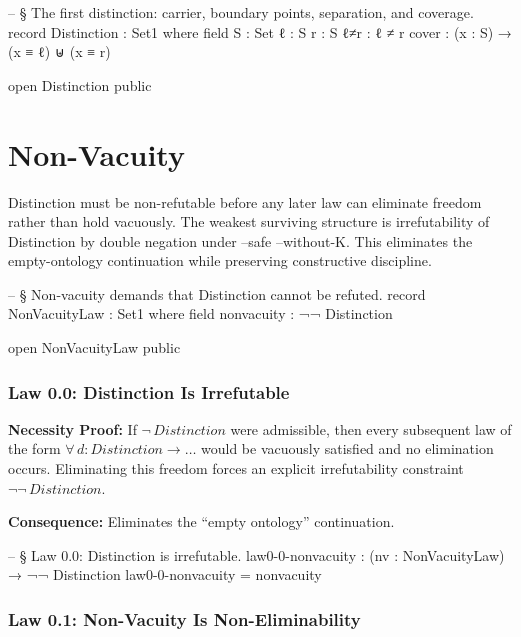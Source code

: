 \documentclass[11pt,a4paper]{book}
\def\texttt#1{#1}%
\begin{document}
\begin{code}
-- § The first distinction: carrier, boundary points, separation, and coverage.
record Distinction : Set1 where
  field
    S     : Set
    ℓ     : S
    r     : S
    ℓ≠r   : ℓ ≠ r
    cover : (x : S) → (x ≡ ℓ) ⊎ (x ≡ r)

open Distinction public
\end{code}

\chapter{Non-Vacuity}

Distinction must be non-refutable before any later law can eliminate freedom rather than hold vacuously.
The weakest surviving structure is irrefutability of \texttt{Distinction} by double negation under \texttt{--safe --without-K}.
This eliminates the empty-ontology continuation while preserving constructive discipline.

\begin{code}
-- § Non-vacuity demands that Distinction cannot be refuted.
record NonVacuityLaw : Set1 where
  field
    nonvacuity : ¬¬ Distinction

open NonVacuityLaw public
\end{code}

\subsection{Law 0.0: Distinction Is Irrefutable}

\textbf{Necessity Proof:} If $\neg\, \mathit{Distinction}$ were admissible, then every subsequent law of the form $\forall\, d : \mathit{Distinction} \to \ldots$ would be vacuously satisfied and no elimination occurs. Eliminating this freedom forces an explicit irrefutability constraint $\neg\neg\, \mathit{Distinction}$.

\textbf{Consequence:} Eliminates the ``empty ontology'' continuation.

\begin{code}
-- § Law 0.0: Distinction is irrefutable.
law0-0-nonvacuity : (nv : NonVacuityLaw) → ¬¬ Distinction
law0-0-nonvacuity = nonvacuity
\end{code}

\subsection{Law 0.1: Non-Vacuity Is Non-Eliminability}
\end{document}
